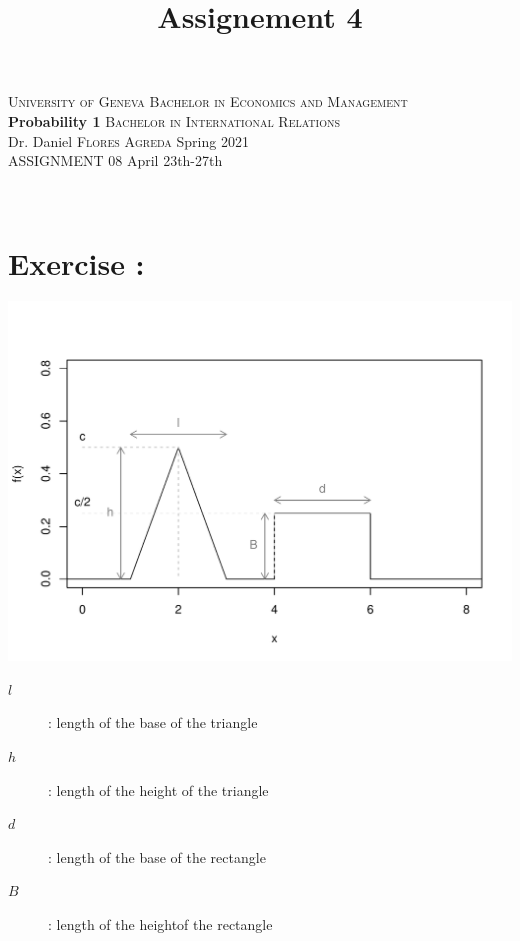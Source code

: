 \documentclass[12pt,thmsa]{article}\usepackage[]{graphicx}\usepackage[]{color}
\title{Assignement 4}
\begin{document}
\noindent \textsc{University of Geneva}     \hfill \textsc{Bachelor in Economics and Management} \\
\textbf{Probability 1}                      \hfill \textsc{Bachelor in International Relations} \\
Dr. Daniel \textsc{Flores Agreda}                 \hfill Spring 2021  \\
ASSIGNMENT 08                               \hfill   April 23th-27th



\noindent
\makebox[\linewidth]{\rule{\textwidth}{0.4pt}}\\[1.5ex]


\addtocounter{section}{1}
\section*{Exercise \thesection:}

\centerline{\includegraphics{figure_corrige.pdf}}

    \begin{center}
   \begin{description}
    \item[$l$]: length of the base of the triangle
    \item[$h$]: length of the height of the triangle
    \item[$d$]: length of the base of the rectangle
    \item[$B$]: length of the heightof the rectangle
    \end{description}
     \end{center}

    \newpage
\end{document}
